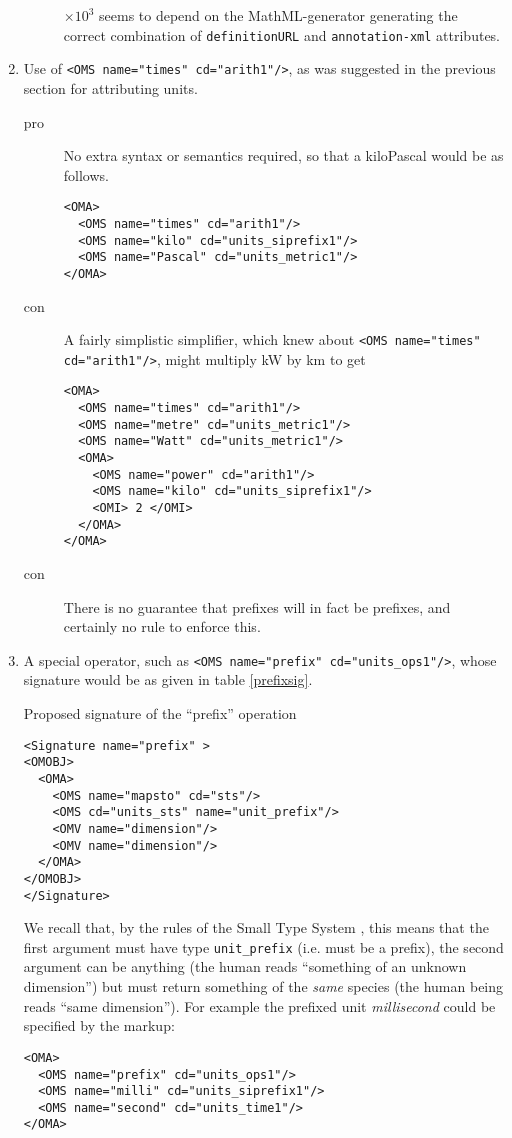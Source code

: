 \documentclass[11pt]{openmathTN}
\begin{document}
\begin{enumerate}
\begin{description}
$\times10^3$ seems to depend on the MathML-generator generating the correct
combination of \verb+definitionURL+ and \verb+annotation-xml+ attri\-butes.
\end{description}
\item Use of \verb+<OMS name="times" cd="arith1"/>+, as was suggested in the
previous section for attributing units.
\begin{description}
\item[pro]No extra syntax or semantics required, so that a
kiloPascal would be as follows.
\begin{verbatim}
<OMA>
  <OMS name="times" cd="arith1"/>
  <OMS name="kilo" cd="units_siprefix1"/>
  <OMS name="Pascal" cd="units_metric1"/>
</OMA>
\end{verbatim}
\item[con]A fairly simplistic simplifier, which knew about \verb+<OMS name="times"+
\verb+cd="arith1"/>+, might multiply kW by km to get
\begin{verbatim}
<OMA>
  <OMS name="times" cd="arith1"/>
  <OMS name="metre" cd="units_metric1"/>
  <OMS name="Watt" cd="units_metric1"/>
  <OMA>
    <OMS name="power" cd="arith1"/>
    <OMS name="kilo" cd="units_siprefix1"/>
    <OMI> 2 </OMI>
  </OMA>
</OMA>
\end{verbatim}
\item[con]There is no guarantee that prefixes will in fact be prefixes, and
certainly no rule to enforce this.
\end{description}
\item\label{prefixop}A special operator, such as
\verb+<OMS name="prefix" cd="units_ops1"/>+,
whose signature would be as given in table \ref{prefixsig}.
\begin{table}[ht]
\caption{Proposed signature of the ``prefix'' operation}\label{prefixsig}
\begin{verbatim}
<Signature name="prefix" >
<OMOBJ>
  <OMA>
    <OMS name="mapsto" cd="sts"/>
    <OMS cd="units_sts" name="unit_prefix"/>
    <OMV name="dimension"/>
    <OMV name="dimension"/>
  </OMA>
</OMOBJ>
</Signature>
\end{verbatim}
\end{table}
We recall that, by the rules of the Small Type System
\cite{Davenport2000c}, this means that the first argument must have type
\verb+unit_prefix+ (i.e. must be a prefix), the second argument can be anything
(the human reads ``something of an unknown dimension'') but must return
something of the {\it same\/} species (the human being reads ``same
dimension''). For example the prefixed unit {\em millisecond} could be
specified by the markup:
\begin{verbatim}
<OMA>
  <OMS name="prefix" cd="units_ops1"/>
  <OMS name="milli" cd="units_siprefix1"/>
  <OMS name="second" cd="units_time1"/>
</OMA>
\end{verbatim}


\end{enumerate}
\end{document}

